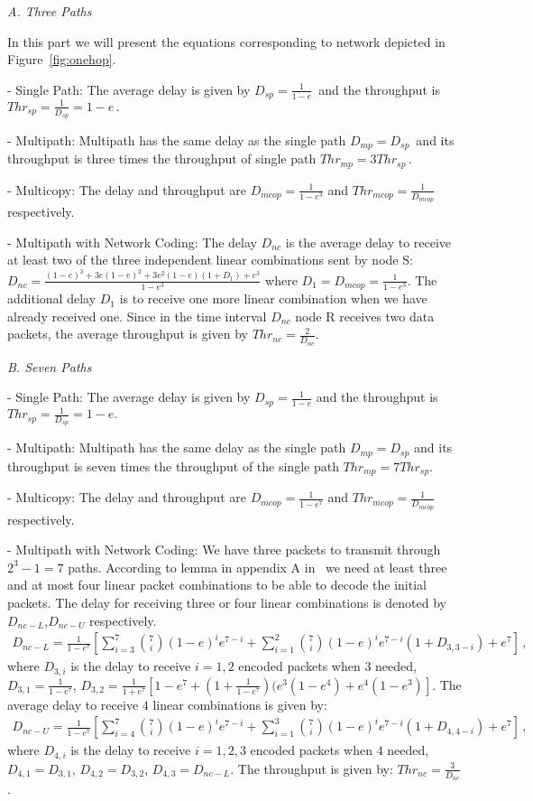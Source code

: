 \documentclass[journal, onecolumn, 12pt]{IEEEtran}
\begin{document}
\textit{A. Three Paths}

In this part we will present the equations corresponding to network depicted in Figure~\ref{fig:onehop}.

- Single Path: The average delay is given by $D_{sp}=\frac{1}{1-e} \,$ and the throughput is $Thr_{sp}=\frac{1}{D_{sp}}=1-e \, .$

- Multipath: Multipath has the same delay as the single path $D_{mp}=D_{sp} \,$ and its throughput is three times the throughput of single path $Thr_{mp}=3 Thr_{sp} \, .$

- Multicopy: The delay and throughput are $D_{mcop}=\frac{1}{1-e^{3}}$ and $Thr_{mcop}=\frac{1}{D_{mcop}}$ respectively.

- Multipath with Network Coding: The delay $D_{nc}$ is the average delay to receive at least two of the three independent linear combinations sent by node S:
$D_{nc}=\frac{(1-e)^{3}+3e(1-e)^{2}+3e^{2}(1-e)(1+D_{1})+e^{3}}{1-e^{3}}$
where $D_{1}=D_{mcop}=\frac{1}{1-e^{3}} .$
The additional delay $D_{1}$ is to receive one more linear combination when we have already received one.
Since in the time interval $D_{nc}$ node R receives two data packets, the average throughput is given by $Thr_{nc}=\frac{2}{D_{nc}} .$

\textit{B. Seven Paths}

- Single Path: The average delay is given by $ D_{sp}=\frac{1}{1-e}$ and the throughput is $Thr_{sp}=\frac{1}{D_{sp}}=1-e .$

- Multipath: Multipath has the same delay as the single path $D_{mp}=D_{sp} $ and its throughput is seven times the throughput of the single path $Thr_{mp}=7 Thr_{sp} .$

- Multicopy: The delay and throughput are $D_{mcop}=\frac{1}{1-e^{7}}$ and $Thr_{mcop}=\frac{1}{D_{mcop}} $ respectively.

- Multipath with Network Coding: We have three packets to transmit through $2^{3}-1=7$ paths.
According to lemma in appendix A in~\cite{b:pathdivgain1} we need at least three and at most four linear packet combinations to be able to decode the initial packets.
The delay for receiving three or four linear combinations is denoted by $D_{nc-L}$,$D_{nc-U}$ respectively.
\begin{align}
D_{nc-L}=\frac{1}{1-e^{7}}\left[\sum_{i=3}^{7} {{{7}\choose i}(1-e)^{i}e^{7-i}}
 + \sum_{i=1}^{2} {{{7}\choose i}(1-e)^{i}e^{7-i}(1+D_{3,3-i})}+e^{7} \right] \, ,
\nonumber
\end{align}
where $D_{3,i}$ is the delay to receive $i=1,2$ encoded packets when $3$ needed, $D_{3,1}=\frac{1}{1-e^{7}}$, $D_{3,2}=\frac{1}{1+e^{7}}[1-e^{7}+(1+\frac{1}{1-e^{7}})(e^{3}(1-e^{4})+e^{4}(1-e{^3})]$.
The average delay to receive $4$ linear combinations is given by:
\begin{align}
D_{nc-U}=\frac{1}{1-e^{7}}\left[\sum_{i=4}^{7} {{{7}\choose i}(1-e)^{i}e^{7-i}}+
 \sum_{i=1}^{3} {{{7}\choose i}(1-e)^{i}e^{7-i}(1+D_{4,4-i})}+e^{7}\right] \, ,
\nonumber
\end{align}
where $D_{4,i}$ is the delay to receive $i=1,2,3$ encoded packets when $4$ needed, $D_{4,1}=D_{3,1}$, $D_{4,2}=D_{3,2}$, $D_{4,3}=D_{nc-L}$.
The throughput is given by: $Thr_{nc}=\frac{3}{D_{nc}}$ .
\end{document}
